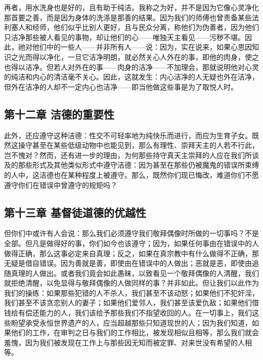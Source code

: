 再者，用水洗身也是好的，且有助于纯洁。我称之为好，并不是因为它像心灵净化那首要之善，而是因为身体的洗涤是那善的结果。因为我们的师傅也曾责备某些法利塞人和经师，他们似乎比别人更好，且与民众分离，称他们为伪善者，因为他们只洁净那些被人看见的事物，却让他们的心——唯独天主看见——污秽不堪。因此，祂对他们中的一些人——并非所有人——说：因为，实在说来，如果心思因知识之光而得以净化，一旦它洁净明朗，就必然关心人外在的事，即他的肉身，使之也得以洁净。但若人对外在的事——肉身的洁净——不加理会，那就说明他对心灵的纯洁和内心的清洁毫不关心。因此，这就发生：内心洁净的人无疑也外在洁净，但外在洁净的人却不一定内心也洁净——即当他做这些事是为了取悦人时。\par


\subsection{第十二章  洁德的重要性}

此外，还应遵守这种洁德：性交不可轻率地为纯快乐而进行，而应为生育子女。既然这操守甚至在某些低级动物中也能见到，那么有理性、崇拜天主的人若不行此，岂不愧对？然而，还有进一步的理由，为何那些持守真天主崇拜的人应在我们所谈及的那些形式及其他类似形式中遵守洁德：因为甚至在那些仍被魔鬼的错误所束缚的人中，这洁德也在某种程度上被遵守。那么，既然你们现已悔改，难道你们不愿遵守你们在错误中曾遵守的规矩吗？\par


\subsection{第十三章  基督徒道德的优越性}

但你们中或许有人会说：那么我们必须遵守我们敬拜偶像时所做的一切事吗？不是全部。但凡是做得好的事，你们如今也该遵守；因为，如果任何事由在错误中的人做得正确，那么这事必定来自真理；反之，如果在真宗教中有什么做得不正确，那无疑是借自错误。因为善就是善，即使由在错误中的人做出；恶就是恶，即使由追随真理的人做出。或者我们竟会如此愚昧，以致看见一个敬拜偶像的人清醒，我们就拒绝清醒，以免显得与敬拜偶像的人做同样的事？并非如此。但让我们以此作为我们的操练：如果那些犯错的人不杀人，我们甚至不该动怒；如果他们不犯奸淫，我们甚至不该贪恋别人的妻子；如果他们爱邻人，我们甚至该爱仇敌；如果他们借钱给有偿还能力的人，我们该给予那些我们不指望收回的人。在一切事上，我们这些盼望承受永恒世界遗产的人，应当超越那些只知道现世的人；因为我们知道，如果他们的工作，在审判之日与我们的工作相比，被发现相似且相等，那么我们就会羞愧，因为我们被发现在工作上与那些因无知而被定罪、对来世没有希望的人相等。\par

